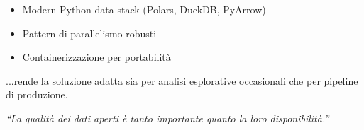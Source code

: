 \begin{itemize}
    \item Modern Python data stack (Polars, DuckDB, PyArrow)
    \item Pattern di parallelismo robusti
    \item Containerizzazione per portabilità
\end{itemize}

...rende la soluzione adatta sia per analisi esplorative occasionali che per pipeline di produzione.

\vspace{1cm}

\begin{center}
\textit{``La qualità dei dati aperti è tanto importante quanto la loro disponibilità.''}
\end{center}
